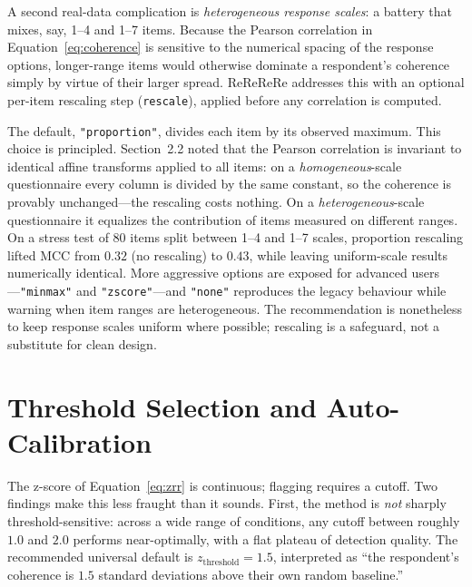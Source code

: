 \documentclass[doc,11pt,donotrepeattitle]{apa7}
\begin{document}
A second real-data complication is \emph{heterogeneous response scales}: a
battery that mixes, say, 1--4 and 1--7 items. Because the Pearson correlation in
Equation~\ref{eq:coherence} is sensitive to the numerical spacing of the
response options, longer-range items would otherwise dominate a respondent's
coherence simply by virtue of their larger spread. ReReReRe addresses this with
an optional per-item rescaling step (\texttt{rescale}), applied before any
correlation is computed.

The default, \texttt{"proportion"}, divides each item by its observed maximum.
This choice is principled. Section~2.2 noted that the Pearson correlation is
invariant to identical affine transforms applied to all items: on a
\emph{homogeneous}-scale questionnaire every column is divided by the same
constant, so the coherence is provably unchanged---the rescaling costs nothing.
On a \emph{heterogeneous}-scale questionnaire it equalizes the contribution of
items measured on different ranges. On a stress test of 80 items split between
1--4 and 1--7 scales, proportion rescaling lifted MCC from $0.32$ (no rescaling)
to $0.43$, while leaving uniform-scale results numerically identical. More
aggressive options are exposed for advanced users---\texttt{"minmax"} and
\texttt{"zscore"}---and \texttt{"none"} reproduces the legacy behaviour while
warning when item ranges are heterogeneous. The recommendation is nonetheless to
keep response scales uniform where possible; rescaling is a safeguard, not a
substitute for clean design.

\section{Threshold Selection and Auto-Calibration}

The z-score of Equation~\ref{eq:zrr} is continuous; flagging requires a cutoff.
Two findings make this less fraught than it sounds. First, the method is
\emph{not} sharply threshold-sensitive: across a wide range of conditions, any
cutoff between roughly $1.0$ and $2.0$ performs near-optimally, with a flat
plateau of detection quality. The recommended universal default is
$z_{\text{threshold}} = 1.5$, interpreted as ``the respondent's coherence is
$1.5$ standard deviations above their own random baseline.''
\end{document}
